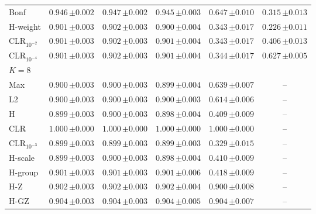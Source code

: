 \begin{tabular}{lccccc}
Bonf & $0.946\,{\scriptstyle\pm 0.002}$ & $0.947\,{\scriptstyle\pm 0.002}$ & $0.945\,{\scriptstyle\pm 0.003}$ & $0.647\,{\scriptstyle\pm 0.010}$ & $0.315\,{\scriptstyle\pm 0.013}$ \\
H-weight & $0.901\,{\scriptstyle\pm 0.003}$ & $0.902\,{\scriptstyle\pm 0.003}$ & $0.900\,{\scriptstyle\pm 0.004}$ & $0.343\,{\scriptstyle\pm 0.017}$ & $0.226\,{\scriptstyle\pm 0.011}$ \\
CLR$_{10^{-2}}$ & $0.901\,{\scriptstyle\pm 0.003}$ & $0.902\,{\scriptstyle\pm 0.003}$ & $0.901\,{\scriptstyle\pm 0.004}$ & $0.343\,{\scriptstyle\pm 0.017}$ & $0.406\,{\scriptstyle\pm 0.013}$ \\
CLR$_{10^{-4}}$ & $0.901\,{\scriptstyle\pm 0.003}$ & $0.902\,{\scriptstyle\pm 0.003}$ & $0.901\,{\scriptstyle\pm 0.004}$ & $0.344\,{\scriptstyle\pm 0.017}$ & $0.627\,{\scriptstyle\pm 0.005}$ \\
\midrule
\multicolumn{6}{l}{$K=8$} \\
Max & $0.900\,{\scriptstyle\pm 0.003}$ & $0.900\,{\scriptstyle\pm 0.003}$ & $0.899\,{\scriptstyle\pm 0.004}$ & $0.639\,{\scriptstyle\pm 0.007}$ & -- \\
L2 & $0.900\,{\scriptstyle\pm 0.003}$ & $0.900\,{\scriptstyle\pm 0.003}$ & $0.900\,{\scriptstyle\pm 0.003}$ & $0.614\,{\scriptstyle\pm 0.006}$ & -- \\
H & $0.899\,{\scriptstyle\pm 0.003}$ & $0.900\,{\scriptstyle\pm 0.003}$ & $0.898\,{\scriptstyle\pm 0.004}$ & $0.409\,{\scriptstyle\pm 0.009}$ & -- \\
CLR & $1.000\,{\scriptstyle\pm 0.000}$ & $1.000\,{\scriptstyle\pm 0.000}$ & $1.000\,{\scriptstyle\pm 0.000}$ & $1.000\,{\scriptstyle\pm 0.000}$ & -- \\
CLR$_{10^{-3}}$ & $0.899\,{\scriptstyle\pm 0.003}$ & $0.899\,{\scriptstyle\pm 0.003}$ & $0.899\,{\scriptstyle\pm 0.003}$ & $0.329\,{\scriptstyle\pm 0.015}$ & -- \\
H-scale & $0.899\,{\scriptstyle\pm 0.003}$ & $0.900\,{\scriptstyle\pm 0.003}$ & $0.898\,{\scriptstyle\pm 0.004}$ & $0.410\,{\scriptstyle\pm 0.009}$ & -- \\
H-group & $0.901\,{\scriptstyle\pm 0.003}$ & $0.901\,{\scriptstyle\pm 0.003}$ & $0.901\,{\scriptstyle\pm 0.006}$ & $0.418\,{\scriptstyle\pm 0.009}$ & -- \\
H-Z & $0.902\,{\scriptstyle\pm 0.003}$ & $0.902\,{\scriptstyle\pm 0.003}$ & $0.902\,{\scriptstyle\pm 0.004}$ & $0.900\,{\scriptstyle\pm 0.008}$ & -- \\
H-GZ & $0.904\,{\scriptstyle\pm 0.003}$ & $0.904\,{\scriptstyle\pm 0.003}$ & $0.904\,{\scriptstyle\pm 0.005}$ & $0.904\,{\scriptstyle\pm 0.007}$ & -- \\

\end{tabular}
